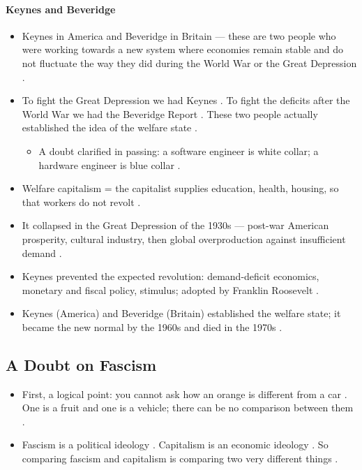 \paragraph{Keynes and Beveridge}
\begin{itemize}
    \item Keynes in America and Beveridge in Britain --- these are two people who were working towards a new system where economies remain stable and do not fluctuate the way they did during the World War or the Great Depression .
    \item To fight the Great Depression we had Keynes . To fight the deficits after the World War we had the Beveridge Report . These two people actually established the idea of the welfare state .
    \begin{itemize}
        \item A doubt clarified in passing: a software engineer is white collar; a hardware engineer is blue collar .
    \end{itemize}
\end{itemize}

\begin{QuickRevision}
\begin{itemize}
    \item Welfare capitalism = the capitalist supplies education, health, housing, so that workers do not revolt .
    \item It collapsed in the Great Depression of the 1930s --- post-war American prosperity, cultural industry, then global overproduction against insufficient demand .
    \item Keynes prevented the expected revolution: demand-deficit economics, monetary and fiscal policy, stimulus; adopted by Franklin Roosevelt .
    \item Keynes (America) and Beveridge (Britain) established the welfare state; it became the new normal by the 1960s and died in the 1970s .
\end{itemize}
\end{QuickRevision}

\subsection{A Doubt on Fascism}
\begin{itemize}
    \item First, a logical point: you cannot ask how an orange is different from a car . One is a fruit and one is a vehicle; there can be no comparison between them .
    \item Fascism is a political ideology . Capitalism is an economic ideology . So comparing fascism and capitalism is comparing two very different things .
\end{itemize}

